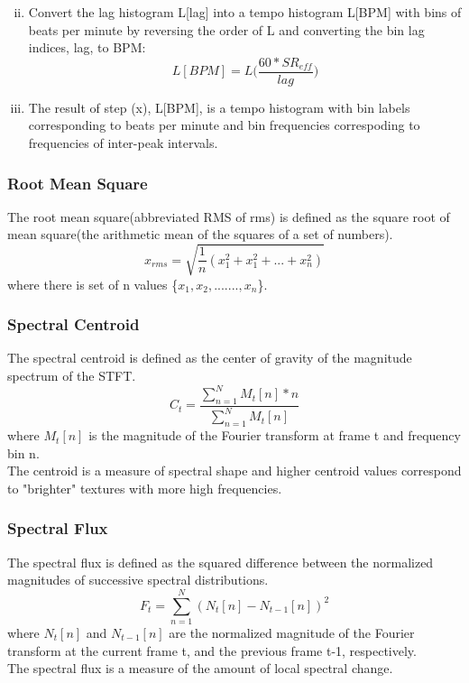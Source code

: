 \begin{enumerate}[(i)]
\begin{equation}
                \end{equation}
        \item Convert the lag histogram L[lag] into a tempo histogram L[BPM] with bins of beats per
                minute by reversing the order of L and converting the bin lag indices, lag, to BPM:
                \begin{equation}
                        L[BPM] = L\Big(\frac{60*SR_{eff}}{lag}\Big)
                \end{equation}
        \item The result of step (x), L[BPM], is a tempo histogram with bin labels corresponding to beats 
                per minute and bin frequencies correspoding to frequencies of inter-peak intervals.

\end{enumerate}
\subsubsection{Root Mean Square}
The root mean square(abbreviated RMS of rms) is defined as the square root of mean square(the arithmetic mean
of the squares of a set of numbers).
\begin{equation}
        x_{rms} = \sqrt{\frac{1}{n}(x_1^2+x_1^2+...+x_n^2)}
\end{equation}
where there is set of n values \{$x_1, x_2, ......., x_n$\}.

\subsubsection{Spectral Centroid}
The spectral centroid is defined as the center of gravity of the magnitude spectrum of the STFT.
\begin{equation}
        C_t = \frac{\sum\limits_{n=1}^{N}{M_t[n]*n}}{\sum\limits_{n=1}^{N}{M_t[n]}}
\end{equation}
where $M_t[n]$ is the magnitude of the Fourier transform at frame t and frequency bin n.\\
The centroid is a measure of spectral shape and higher centroid values correspond to "brighter" textures with more high frequencies.

\subsubsection{Spectral Flux}
The spectral flux is defined as the squared difference between the normalized magnitudes of successive spectral distributions.
\begin{equation}
        F_t = \sum_{n=1}^{N}{(N_t[n]-N_{t-1}[n])^2}
\end{equation}
where $N_t[n]$ and $N_{t-1}[n]$ are the normalized magnitude of the Fourier transform at the current frame t, and the previous frame t-1, 
respectively.\\ 
The spectral flux is a measure of the amount of local spectral change.

